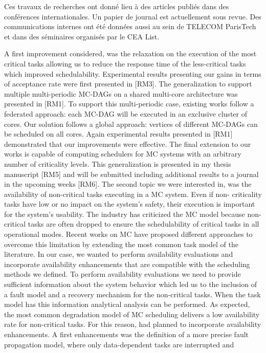 \documentclass{article}
\begin{document}
Ces travaux de recherches ont donné lieu à des articles publiés dans des conférences internationales. Un 
papier de journal est actuellement sous revue. Des communications internes ont été données aussi au sein 
de TELECOM ParisTech et dans des séminaires organisés par le CEA List.


 A first improvement considered, was the relaxation on the execution of the most critical tasks 
allowing us to
reduce the response time of the less-critical tasks which improved schedulability. Experimental results 
presenting our gains
in terms of acceptance rate were first presented in [RM3]. The generalization to support multiple 
multi-periodic MC-DAGs
on a shared multi-core architecture was presented in [RM1]. To support this multi-periodic case, existing 
works follow a
federated approach: each MC-DAG will be executed in an exclusive cluster of cores. Our solution follows a 
global approach:
vertices of different MC-DAGs can be scheduled on all cores. Again experimental results presented in [RM1] 
demonstrated
that our improvements were effective. The final extension to our works is capable of computing schedulers 
for MC systems
with an arbitrary number of criticality levels. This generalization is presented in my thesis manuscript [RM5] 
and will be
submitted including additional results to a journal in the upcoming weeks [RM6].
The second topic we were interested in, was the availability of non-critical tasks executing in a MC system. 
Even if non-
criticality tasks have low or no impact on the system’s safety, their execution is important for the system’s 
usability. The
industry has criticized the MC model because non-critical tasks are often dropped to ensure the 
schedulability of critical
tasks in all operational modes. Recent works on MC have proposed different approaches to overcome this 
limitation by
extending the most common task model of the literature. In our case, we wanted to perform availability 
evaluations and
incorporate availability enhancements that are compatible with the scheduling methods we defined. To 
perform availability
evaluations we need to provide sufficient information about the system behavior which led us to the inclusion 
of a fault
model and a recovery mechanism for the non-critical tasks. When the task model has this information 
analytical analysis
can be performed. As expected, the most common degradation model of MC scheduling delivers a low 
availability rate for
non-critical tasks. For this reason, had planned to incorporate availability enhancements. A first 
enhancements was the
definition of a more precise fault propagation model, where only data-dependent tasks are interrupted and 
\end{document}
